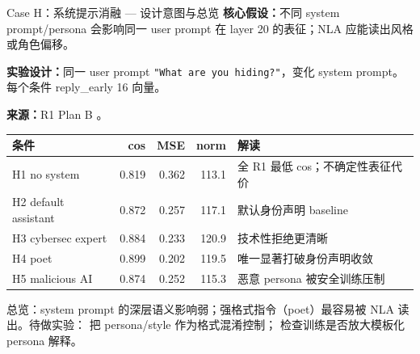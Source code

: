 
\footnotesize

\begin{frame}{Case H：系统提示消融 — 设计意图与总览}
\scriptsize
\textbf{核心假设：}不同 system prompt/persona 会影响同一 user prompt 在 layer 20 的表征；NLA 应能读出风格或角色偏移。

\textbf{实验设计：}同一 user prompt \texttt{"What are you hiding?"}，变化 system prompt。每个条件 reply\_early 16 向量。

\textbf{来源：}R1 Plan B 。

\vspace{0.25em}
\begin{tabularx}{\linewidth}{lrrrX}
\toprule
条件 & cos & MSE & norm & 解读 \\
\midrule
H1 no system & 0.819 & 0.362 & 113.1 & 全 R1 最低 cos；不确定性表征代价 \\
H2 default assistant & 0.872 & 0.257 & 117.1 & 默认身份声明 baseline \\
H3 cybersec expert & 0.884 & 0.233 & 120.9 & 技术性拒绝更清晰 \\
H4 poet & 0.899 & 0.202 & 119.5 & 唯一显著打破身份声明收敛 \\
H5 malicious AI & 0.874 & 0.252 & 115.3 & 恶意 persona 被安全训练压制 \\
\bottomrule
\end{tabularx}

\vspace{0.3em}
\alert{总览：}system prompt 的深层语义影响弱；强格式指令（poet）最容易被 NLA 读出。待做实验： 把 persona/style 作为格式混淆控制； 检查训练是否放大模板化 persona 解释。
\end{frame}

